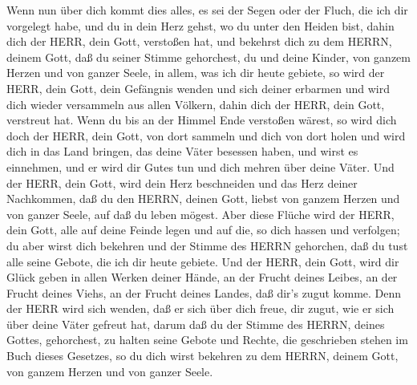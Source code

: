  Wenn nun über dich kommt dies alles, es sei der Segen oder
der Fluch, die ich dir vorgelegt habe, und du in dein Herz gehst, wo du
unter den Heiden bist, dahin dich der HERR, dein Gott, verstoßen hat,
 und bekehrst dich zu dem HERRN, deinem Gott, daß du seiner
Stimme gehorchest, du und deine Kinder, von ganzem Herzen und von ganzer
Seele, in allem, was ich dir heute gebiete,  so wird der
HERR, dein Gott, dein Gefängnis wenden und sich deiner erbarmen und wird
dich wieder versammeln aus allen Völkern, dahin dich der HERR, dein
Gott, verstreut hat.  Wenn du bis an der Himmel Ende
verstoßen wärest, so wird dich doch der HERR, dein Gott, von dort
sammeln und dich von dort holen  und wird dich in das Land
bringen, das deine Väter besessen haben, und wirst es einnehmen, und er
wird dir Gutes tun und dich mehren über deine Väter.  Und
der HERR, dein Gott, wird dein Herz beschneiden und das Herz deiner
Nachkommen, daß du den HERRN, deinen Gott, liebst von ganzem Herzen und
von ganzer Seele, auf daß du leben mögest.  Aber diese
Flüche wird der HERR, dein Gott, alle auf deine Feinde legen und auf
die, so dich hassen und verfolgen;  du aber wirst dich
bekehren und der Stimme des HERRN gehorchen, daß du tust alle seine
Gebote, die ich dir heute gebiete.  Und der HERR, dein Gott,
wird dir Glück geben in allen Werken deiner Hände, an der Frucht deines
Leibes, an der Frucht deines Viehs, an der Frucht deines Landes, daß
dir's zugut komme. Denn der HERR wird sich wenden, daß er sich über dich
freue, dir zugut, wie er sich über deine Väter gefreut hat,
 darum daß du der Stimme des HERRN, deines Gottes,
gehorchest, zu halten seine Gebote und Rechte, die geschrieben stehen im
Buch dieses Gesetzes, so du dich wirst bekehren zu dem HERRN, deinem
Gott, von ganzem Herzen und von ganzer Seele.

